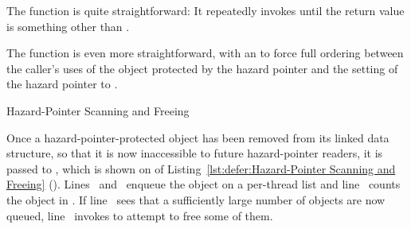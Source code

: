 \begin{fcvref}
\QuickQuizEnd

The  function is quite straightforward: It repeatedly
invokes  until the return value is something other
than .

\QuickQuizEnd

The  function is even more straightforward, with
an  to force full ordering between the caller's uses
of the object protected by the hazard pointer and the setting of
the hazard pointer to .
\end{fcvref}

\begin{listing}
\caption{Hazard-Pointer Scanning and Freeing}
\label{lst:defer:Hazard-Pointer Scanning and Freeing}
\end{listing}

\begin{fcvref}
Once a hazard-pointer-protected object has been removed from its
linked data structure, so that it is now inaccessible to future
hazard-pointer readers, it is passed to ,
which is shown on  of
Listing~\ref{lst:defer:Hazard-Pointer Scanning and Freeing}
().
Lines~ and~
enqueue the object on a per-thread list 
and line~ counts the object in .
If line~ sees that a sufficiently large number of objects are now
queued, line~ invokes  to attempt to
free some of them.
\end{fcvref}

